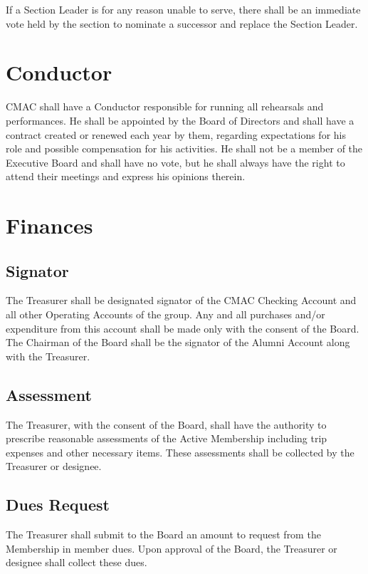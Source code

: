 \documentclass{article}
\begin{document}
If a Section Leader is for any reason unable to serve, there shall
be an immediate vote held by the section to nominate a successor and
replace the Section Leader.

\section{Conductor}

CMAC shall have a Conductor responsible for running all rehearsals
and performances. He shall be appointed by the Board of Directors
and shall have a contract created or renewed each year by them, regarding
expectations for his role and possible compensation for his activities.
He shall not be a member of the Executive Board and shall have no
vote, but he shall always have the right to attend their meetings
and express his opinions therein.

\section{Finances}

\subsection{Signator}

The Treasurer shall be designated signator of the CMAC Checking Account
and all other Operating Accounts of the group. Any and all purchases
and/or expenditure from this account shall be made only with the consent
of the Board. The Chairman of the Board shall be the signator of the
Alumni Account along with the Treasurer.

\subsection{Assessment}

The Treasurer, with the consent of the Board, shall have the authority
to prescribe reasonable assessments of the Active Membership including
trip expenses and other necessary items. These assessments shall be
collected by the Treasurer or designee.

\subsection{Dues Request}

The Treasurer shall submit to the Board an amount to request from
the Membership in member dues. Upon approval of the Board, the Treasurer
or designee shall collect these dues.
\end{document}
